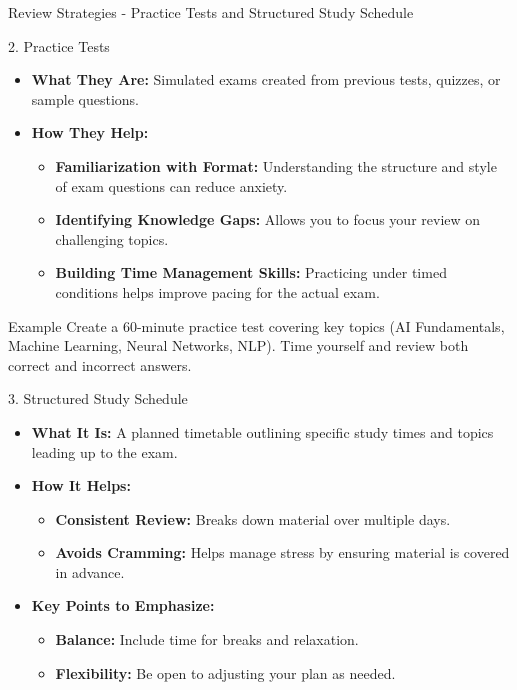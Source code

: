 \documentclass[aspectratio=169]{beamer}
\begin{document}
\begin{frame}[fragile]{Review Strategies - Practice Tests and Structured Study Schedule}
    \begin{block}{2. Practice Tests}
        \begin{itemize}
            \item \textbf{What They Are:} Simulated exams created from previous tests, quizzes, or sample questions.
            \item \textbf{How They Help:}
            \begin{itemize}
                \item \textbf{Familiarization with Format:} Understanding the structure and style of exam questions can reduce anxiety.
                \item \textbf{Identifying Knowledge Gaps:} Allows you to focus your review on challenging topics.
                \item \textbf{Building Time Management Skills:} Practicing under timed conditions helps improve pacing for the actual exam.
            \end{itemize}
        \end{itemize}
    \end{block}
    \begin{block}{Example}
        Create a 60-minute practice test covering key topics (AI Fundamentals, Machine Learning, Neural Networks, NLP). Time yourself and review both correct and incorrect answers.
    \end{block}
    
    \begin{block}{3. Structured Study Schedule}
        \begin{itemize}
            \item \textbf{What It Is:} A planned timetable outlining specific study times and topics leading up to the exam.
            \item \textbf{How It Helps:}
            \begin{itemize}
                \item \textbf{Consistent Review:} Breaks down material over multiple days.
                \item \textbf{Avoids Cramming:} Helps manage stress by ensuring material is covered in advance.
            \end{itemize}
            \item \textbf{Key Points to Emphasize:}
            \begin{itemize}
                \item \textbf{Balance:} Include time for breaks and relaxation.
                \item \textbf{Flexibility:} Be open to adjusting your plan as needed.
            \end{itemize}
        \end{itemize}
    \end{block}
\end{frame}
\end{document}
